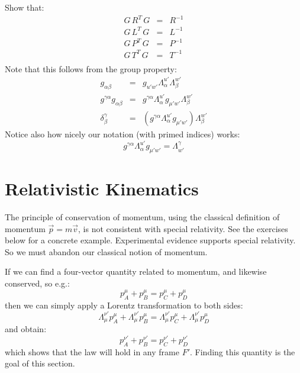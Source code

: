 \documentclass[12pt]{article}
\begin{document}
\exercise Show that:
\begin{eqnarray*}
  G \, R^T \, G &=& R^{-1} \\
  G \, L^T \, G &=& L^{-1} \\
  G \, P^T \, G &=& P^{-1} \\
  G \, T ^T\, G &=& T^{-1} \\
\end{eqnarray*}
Note that this follows from the group property:
\begin{eqnarray*}
  g_{\alpha\beta} &=& g_{u'w'} \Lambda^{u'}_\alpha \Lambda^{w'}_{\beta}\\
  g^{\gamma\alpha} g_{\alpha\beta} &=& g^{\gamma\alpha} \Lambda^{u'}_{\alpha} g_{\mu'w'}\Lambda^{w'}_\beta\\
\delta^\gamma_\beta &=& (g^{\gamma\alpha} \Lambda^{u'}_{\alpha} g_{\mu'w'}) \Lambda^{w'}_\beta
\end{eqnarray*}
Notice also how nicely our notation (with primed indices) works:
$$g^{\gamma\alpha} \Lambda^{u'}_{\alpha} g_{\mu'w'} = \Lambda^{\gamma}_{w'} $$

\section{Relativistic Kinematics}


The principle of conservation of momentum, using the classical
definition of momentum $\vec{p}=m\vec{v}$, is not consistent with
special relativity.  See the exercises below for a concrete example.
Experimental evidence supports special relativity.  So we must abandon
our classical notion of momentum.

If we can find a four-vector quantity related to momentum, and
likewise conserved, so e.g.:
$$p^\mu_A + p^\mu_B = p^\mu_C + p^\mu_D$$
then we can simply apply a Lorentz transformation to both sides:
$$\Lambda^{\nu'}_\mu p^\mu_A + \Lambda^{\nu'}_\mu p^\mu_B = \Lambda^{\nu'}_\mu p^\mu_C + \Lambda^{\nu'}_\mu p^\mu_D$$
and obtain:
$$p^{\nu'}_A + p^{\nu'}_B = p^{\nu'}_C + p^{\nu'}_D$$
which shows that the law will hold in any frame $F'$.  Finding this
quantity is the goal of this section.
\end{document}
